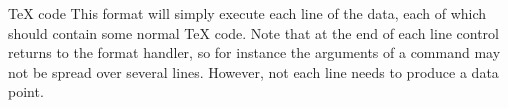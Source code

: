 \begin{dataformat}{TeX code}
  This format will simply execute each line of the data, each of which
  should contain some normal TeX code. Note that at the end of each
  line control returns to the format handler, so for instance the
  arguments of a command may not be spread over several
  lines. However, not each line needs to produce a data point.
  \begin{codeexample}[]
  \end{codeexample}  
\end{dataformat}

